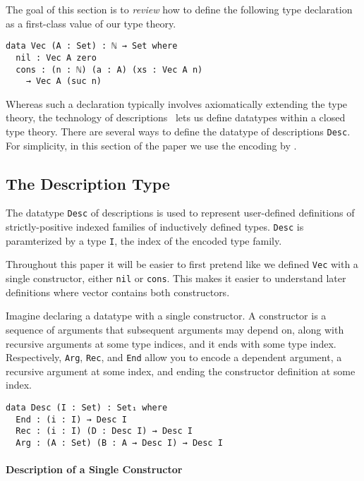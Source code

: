 \documentclass[preprint,nonatbib]{sigplanconf}
\begin{document}
The goal of this section is to {\it review} how to define the following type
declaration as a first-class value of our type theory. 

\begin{verbatim}
data Vec (A : Set) : ℕ → Set where
  nil : Vec A zero
  cons : (n : ℕ) (a : A) (xs : Vec A n)
    → Vec A (suc n)
\end{verbatim}

Whereas such a declaration typically involves axiomatically extending
the type theory, the technology of
descriptions~\citep{Chapman:2010:GAL:1932681.1863547,mcbride2010ornamental,dagand:phd}
lets us define datatypes within a closed type theory.
There are
several ways to define the datatype of descriptions {\tt Desc}. 
For simplicity, in this section of the paper we use the encoding by
\citet{mcbride2010ornamental}.


\subsection{The Description Type}

The datatype {\tt Desc} of descriptions is used to represent
user-defined definitions of strictly-positive indexed
families of inductively defined types.
{\tt Desc} is paramterized by 
a type {\tt I}, the index of the encoded type family.

Throughout this paper it will be easier to first pretend like we
defined {\tt Vec} with a single constructor, either
{\tt nil} or {\tt cons}. This makes it easier to understand
later definitions where vector contains both constructors.

Imagine declaring a datatype with a single constructor.
A constructor is a sequence of
arguments that subsequent arguments may depend on, along with
recursive arguments at some type indices, and it ends with some type index.
Respectively, {\tt Arg}, {\tt Rec}, and {\tt End} allow you to encode
a dependent argument, a recursive argument at some index, and ending the
constructor definition at some index.

\begin{verbatim}
data Desc (I : Set) : Set₁ where
  End : (i : I) → Desc I
  Rec : (i : I) (D : Desc I) → Desc I
  Arg : (A : Set) (B : A → Desc I) → Desc I
\end{verbatim}

\paragraph{Description of a Single Constructor}
\end{document}
